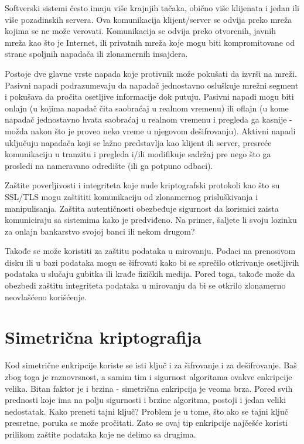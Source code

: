\documentclass[a4paper]{article}
\begin{document}
Softverski sistemi često imaju više krajnjih tačaka, obično više klijenata i jedan ili više pozadinskih servera. Ova komunikacija klijent/server se odvija preko mreža kojima se ne može verovati. Komunikacija se odvija preko otvorenih, javnih mreža kao što je Internet, ili privatnih mreža koje mogu biti kompromitovane od strane spoljnih napadača ili zlonamernih insajdera.

 Postoje dve glavne vrste napada koje protivnik može pokušati da izvrši na mreži. Pasivni napadi podrazumevaju da napadač jednostavno osluškuje mrežni segment i pokušava da pročita osetljive informacije dok putuju. Pasivni napadi mogu biti onlajn (u kojima napadač čita saobraćaj u realnom vremenu) ili oflajn (u kome napadač jednostavno hvata saobraćaj u realnom vremenu i pregleda ga kasnije - možda nakon što je proveo neko vreme u njegovom dešifrovanju). Aktivni napadi uključuju napadača koji se lažno predstavlja kao klijent ili server, presreće komunikaciju u tranzitu i pregleda i/ili modifikuje sadržaj pre nego što ga prosledi na nameravano odredište (ili ga potpuno odbaci).

Zaštite poverljivosti i integriteta koje nude kriptografski protokoli kao što su SSL/TLS mogu zaštititi komunikaciju od zlonamernog prisluškivanja i manipulisanja. Zaštita autentičnosti obezbeđuje sigurnost da korisnici zaista komuniciraju sa sistemima kako je predviđeno. Na primer, šaljete li svoju lozinku za onlajn bankarstvo svojoj banci ili nekom drugom?

Takođe se može koristiti za zaštitu podataka u mirovanju. Podaci na prenosivom disku ili u bazi podataka mogu se šifrovati kako bi se sprečilo otkrivanje osetljivih podataka u slučaju gubitka ili krađe fizičkih medija. Pored toga, takođe može da obezbedi zaštitu integriteta podataka u mirovanju da bi se otkrilo zlonamerno neovlašćeno korišćenje.

\section{Simetrična kriptografija}
\label{sec:simetricčna_kriptografija}
Kod simetrične enkripcije \cite{sim} koriste se isti ključ i za šifrovanje i za dešifrovanje. Baš zbog toga je raznovrsnost, a samim tim i sigurnost algoritama ovakve enkripcije velika. Bitan faktor je i brzina - simetrična enkripcija je veoma brza. Pored svih prednosti koje ima na polju sigurnosti i brzine algoritma, postoji i jedan veliki nedostatak. Kako preneti tajni ključ? Problem je u tome, što ako se tajni ključ presretne, poruka se može pročitati. Zato se ovaj tip enkripcije najčešće koristi prilikom zaštite podataka koje ne delimo sa drugima.
\end{document}
